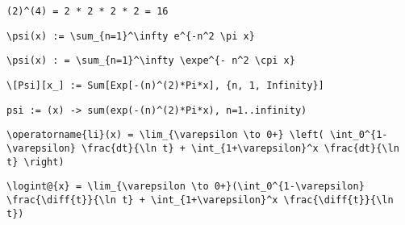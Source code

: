 \newsavebox\AFMA
\begin{lrbox}{\AFMA}
 \begin{minipage}[t]{0.82\textwidth}
  \lstinline[language={[latex]TeX},mathescape,breaklines=true]"(2)^(4) = 2 * 2 * 2 * 2 = 16"
 \end{minipage}
\end{lrbox}
\newsavebox\AGT
\begin{lrbox}{\AGT}
 \begin{minipage}[t]{0.82\textwidth}
  \lstinline[language={[latex]TeX},mathescape,breaklines=true]"\psi(x) := \sum_{n=1}^\infty e^{-n^2 \pi x}"
 \end{minipage}
\end{lrbox}
\newsavebox\AGST
\begin{lrbox}{\AGST}
 \begin{minipage}[t]{0.82\textwidth}
  \lstinline[language={[latex]TeX},mathescape,breaklines=true]"\psi(x) : = \sum_{n=1}^\infty \expe^{- n^2 \cpi x}"
 \end{minipage}
\end{lrbox}
\newsavebox\AGMM
\begin{lrbox}{\AGMM}
 \begin{minipage}[t]{0.82\textwidth}
  \lstinline[language={[latex]TeX},mathescape,breaklines=true]"\[Psi][x_] := Sum[Exp[-(n)^(2)*Pi*x], {n, 1, Infinity}]"
 \end{minipage}
\end{lrbox}
\newsavebox\AGMA
\begin{lrbox}{\AGMA}
 \begin{minipage}[t]{0.82\textwidth}
  \lstinline[language={[latex]TeX},mathescape,breaklines=true]"psi := (x) -> sum(exp(-(n)^(2)*Pi*x), n=1..infinity)"
 \end{minipage}
\end{lrbox}
\newsavebox\AHT
\begin{lrbox}{\AHT}
 \begin{minipage}[t]{0.82\textwidth}
  \lstinline[language={[latex]TeX},mathescape,breaklines=true]"\operatorname{li}(x) = \lim_{\varepsilon \to 0+} \left( \int_0^{1-\varepsilon} \frac{dt}{\ln t} + \int_{1+\varepsilon}^x \frac{dt}{\ln t} \right)"
 \end{minipage}
\end{lrbox}
\newsavebox\AHST
\begin{lrbox}{\AHST}
 \begin{minipage}[t]{0.82\textwidth}
  \lstinline[language={[latex]TeX},mathescape,breaklines=true]"\logint@{x} = \lim_{\varepsilon \to 0+}(\int_0^{1-\varepsilon} \frac{\diff{t}}{\ln t} + \int_{1+\varepsilon}^x \frac{\diff{t}}{\ln t})"
 \end{minipage}
\end{lrbox}
